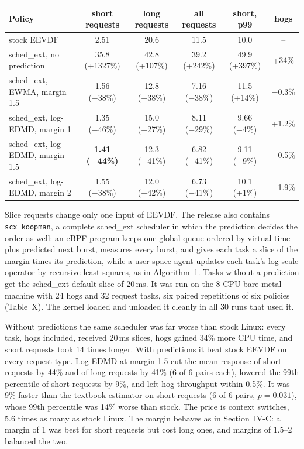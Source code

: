 \documentclass{article}
\begin{document}
\begin{tabular}{lccccc}
\toprule
Policy & short requests & long requests & all requests & short, p99 & hogs \\
\midrule
stock EEVDF & 2.51 & 20.6 & 11.5 & 10.0 & -- \\
sched\_ext, no prediction & 35.8 (+1327\%) & 42.8 (+107\%) & 39.2 (+242\%) & 49.9 (+397\%) & +34\% \\
sched\_ext, EWMA, margin 1.5 & 1.56 (−38\%) & 12.8 (−38\%) & 7.16 (−38\%) & 11.5 (+14\%) & −0.3\% \\
sched\_ext, log-EDMD, margin 1 & 1.35 (−46\%) & 15.0 (−27\%) & 8.11 (−29\%) & 9.66 (−4\%) & +1.2\% \\
sched\_ext, log-EDMD, margin 1.5 & \textbf{1.41 (−44\%)} & 12.3 (−41\%) & 6.82 (−41\%) & 9.11 (−9\%) & −0.5\% \\
sched\_ext, log-EDMD, margin 2 & 1.55 (−38\%) & 12.0 (−42\%) & 6.73 (−41\%) & 10.1 (+1\%) & −1.9\% \\
\bottomrule
\end{tabular}




Slice requests change only one input of EEVDF. The release also contains \texttt{scx\_koopman}, a complete sched\_ext scheduler in which the prediction decides the order as well: an eBPF program keeps one global queue ordered by virtual time plus predicted next burst, measures every burst, and gives each task a slice of the margin times its prediction, while a user-space agent updates each task's log-scale operator by recursive least squares, as in Algorithm~1. Tasks without a prediction get the sched\_ext default slice of 20\,ms. It was run on the 8-CPU bare-metal machine with 24 hogs and 32 request tasks, six paired repetitions of six policies (Table~X). The kernel loaded and unloaded it cleanly in all 30 runs that used it.

Without predictions the same scheduler was far worse than stock Linux: every task, hogs included, received 20\,ms slices, hogs gained 34\% more CPU time, and short requests took 14 times longer. With predictions it beat stock EEVDF on every request type. Log-EDMD at margin 1.5 cut the mean response of short requests by 44\% and of long requests by 41\% (6 of 6 pairs each), lowered the 99th percentile of short requests by 9\%, and left hog throughput within 0.5\%. It was 9\% faster than the textbook estimator on short requests (6 of 6 pairs, $p=0.031$), whose 99th percentile was 14\% worse than stock. The price is context switches, 5.6 times as many as stock Linux. The margin behaves as in Section~IV-C: a margin of 1 was best for short requests but cost long ones, and margins of 1.5--2 balanced the two.
\end{document}
